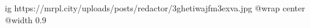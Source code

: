  
 
 
 
 

\ifcmt
  ig https://mrpl.city/uploads/posts/redactor/3ghetiwajfm3exva.jpg
  @wrap center
  @width 0.9
\fi
